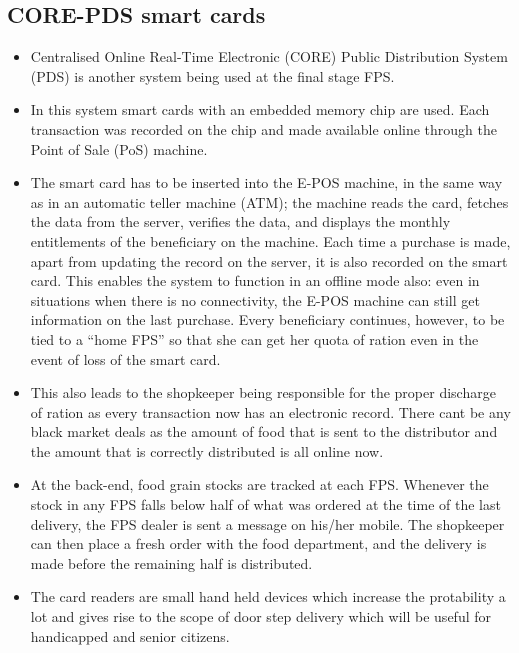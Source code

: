 \documentclass[a4paper,11pt]{article}
\begin{document}
\subsection{CORE-PDS smart cards}
\begin{itemize}
    \item Centralised Online Real-Time Electronic (CORE) Public Distribution System (PDS) is another system being used at the final stage FPS. 

    \item In this system smart cards with an embedded memory chip are used. Each transaction was recorded on the chip and made available online through the Point of Sale (PoS) machine.
    
    \item The smart card has to be inserted into the E-POS machine, in the same way as in an automatic teller machine (ATM); the machine reads the card, fetches the data from the server, verifies the data, and displays the monthly entitlements of the beneficiary on the machine. Each time a purchase is made, apart from updating the record on the server, it is also recorded on the smart card. This enables the system to function in an offline mode also: even in situations when there is no connectivity, the E-POS machine can still get information on the last purchase. Every beneficiary continues, however, to be tied to a “home FPS” so that she can get her quota of ration even in the event of loss of the smart card.
    
    \item This also leads to the shopkeeper being responsible for the proper discharge of ration as every transaction now has an electronic record. There cant be any black market deals as the amount of food that is sent to the distributor and the amount that is correctly distributed is all online now. 
    
    \item At the back-end, food grain stocks are tracked at each FPS. Whenever the stock in any FPS falls below half of what was ordered at the time of the last delivery, the FPS dealer is sent a message on his/her mobile. The shopkeeper can then place a fresh order with the food department, and the delivery is made before the remaining half is distributed.
    
    \item The card readers are small hand held devices which increase the protability a lot and gives rise to the scope of door step delivery which will be useful for handicapped and senior citizens. 
    
\end{itemize}
\end{document}
